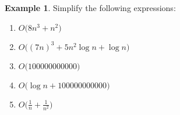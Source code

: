 \documentclass[10pt]{article}
\theoremstyle{definition}
\newtheorem{example}{Example}
\begin{document}
\newpage
\begin{example}
    Simplify the following expressions:

\begin{enumerate}
    \item $O\bigg(8n^3 + n^2 \bigg)$
    \vspace{1.5in}
    \item $O\bigg((7n)^3 + 5n^2\log n + \log n \bigg)$
    \vspace{1.5in}
    \item $O\bigg(100000000000 \bigg)$
    \vspace{1.5in}
    \item $O\bigg(\log n + 100000000000 \bigg)$
    \vspace{1.5in}
\item $O\bigg(\frac 1 n + \frac 1 {n^2}\bigg)$
    \vspace{1.5in}
\end{enumerate}
\end{example}

\vspace{0.25in}
\noindent

\end{document}
